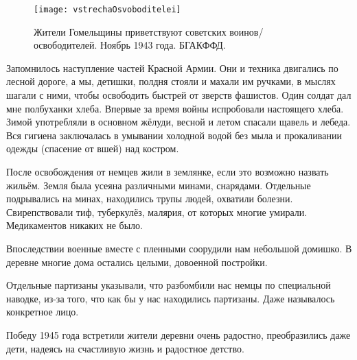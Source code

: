 \begin{wrapfigure}{O}{.4\textwidth}
\centering
\texttt{[image: vstrechaOsvoboditelei]}
\caption{Жители Гомельщины приветствуют советских воинов\-/освободителей. Ноябрь 1943 года. БГАКФФД.}
\label{fig:vstrechaOsvoboditelei}
\end{wrapfigure}

Запомнилось наступление частей Красной Армии. Они и техника двигались по лесной дороге, а мы, детишки, полдня стояли и махали им ручками, в мыслях шагали с ними, чтобы освободить быстрей от зверств фашистов. Один солдат дал мне полбуханки хлеба. Впервые за время войны испробовали настоящего хлеба. Зимой употребляли в основном жёлуди, весной и летом спасали щавель и лебеда. Вся гигиена заключалась в умывании холодной водой без мыла и прокаливании одежды (спасение от вшей) над костром.

После освобождения от немцев жили в землянке, если это возможно назвать жильём. Земля была усеяна различными минами, снарядами. Отдельные подрывались на минах, находились трупы людей, охватили болезни. Свирепствовали тиф, туберкулёз, малярия, от которых многие умирали. Медикаментов никаких не было. 

Впоследствии военные вместе с пленными соорудили нам небольшой домишко. В деревне многие дома остались целыми, довоенной постройки. 

Отдельные партизаны указывали, что разбомбили нас немцы по специальной наводке, из-за того, что как бы у нас находились партизаны. Даже называлось конкретное лицо. 

Победу 1945 года встретили жители деревни очень радостно, преобразились даже дети, надеясь на счастливую жизнь и радостное детство.
